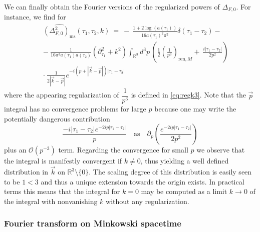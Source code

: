 \documentclass[12pt]{book}
\let\int\int
\def\bigint{\displaystyle\int}
\newcommand{\Ocal}{\mathcal{O}}
\theoremstyle{break}
\begin{document}
We can finally obtain the Fourier versions of the regularized powers of $\Delta_{F,0}$. For instance, we find for 
%
\begin{eqnarray}
&& \widehat{\left(\Delta^2_{F,0}\right)_\text{ms}}(\tau_1,\tau_2,k) \ = \ - \ \frac{1+2\log (a(\tau_1))}{16a(\tau_1)^2\pi^2}\delta(\tau_1-\tau_2)- \nonumber \\
&& - \ \frac{1}{16\pi^3 a(\tau_1)a(\tau_2)}(\partial^2_{\tau_1}+k^2)\bigint_{\mathbb{R}^3}d^3p\,\left(\frac12\left(\frac{1}{p^3}\right)_{\text{ren},M}  + \ \frac{i|\tau_1-\tau_2|}{2p^2}\right) \nonumber \\
&& \cdot \ \frac{1}{2|\vec{k}-\vec{p}|}e^{-i(p+|\vec{k}-\vec{p}|)|\tau_1-\tau_2|}
\label{eq:fourier_square}
\end{eqnarray}
%
where the appearing regularization of $\dfrac{1}{p^3}$ is defined in \eqref{eq:regk3}. Note that the $\vec{p}$ integral has no convergence problems for large $p$ because one may write the potentially dangerous contribution 
%
\begin{equation*}
\frac{-i|\tau_1-\tau_2|e^{-2ip|\tau_1-\tau_2|}}{p}
\quad
\mbox{as}
\quad
\partial_p\left( \dfrac{e^{-2ip|\tau_1-\tau_2|}}{2p^2}\right) 
\end{equation*}
%
plus an $\Ocal(p^{-3})$ term. Regarding the convergence for small $p$ we observe that the integral is manifestly convergent if $k\neq0$, thus yielding a well defined distribution in $\vec{k}$ on $\mathbb{R}^3\setminus\{0\}$. The scaling degree of this distribution is easily seen to be $1<3$ and thus a unique extension towards the origin exists. In practical terms this means that the integral for $k=0$ may be computed as a limit $k\to0$ of the integral with nonvanishing $k$ without any regularization. 


\subsubsection{Fourier transform on Minkowski spacetime}
\end{document}
